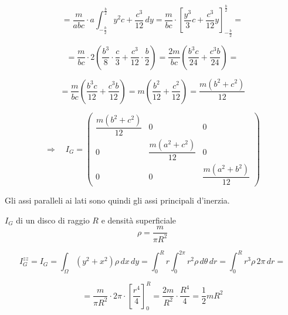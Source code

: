 \begin{example}{}
\[
=
\frac{m}{abc}\cdot a
\int_{-\frac{b}{2}}^{\frac{b}{2}}
y^2c+\frac{c^3}{12}
\,dy
=
\frac{m}{bc}\cdot
\left[
\frac{y^3}{3}c+\frac{c^3}{12}y
\right]_{-\frac{b}{2}}^{\frac{b}{2}}
=
\]

\[
=
\frac{m}{bc}\cdot 2
\left(
\frac{b^3}{8}\cdot\frac{c}{3}
+
\frac{c^3}{12}\cdot\frac{b}{2}
\right)
=
\frac{2m}{bc}
\left(
\frac{b^3c}{24}
+
\frac{c^3b}{24}
\right)
=
\]

\[
=
\frac{m}{bc}
\left(
\frac{b^3c}{12}
+
\frac{c^3b}{12}
\right)
=
m\left(
\frac{b^2}{12}
+
\frac{c^2}{12}
\right)
=
\frac{m(b^2+c^2)}{12}
\]

\[
\Rightarrow\quad
I_G=
\left(
\begin{array}{ccc}
\dfrac{m(b^2+c^2)}{12} & 0 & 0 \\[0.8em]
0 & \dfrac{m(a^2+c^2)}{12} & 0 \\[0.8em]
0 & 0 & \dfrac{m(a^2+b^2)}{12}
\end{array}
\right)
\]

Gli assi paralleli ai lati sono quindi gli assi principali d'inerzia.
\end{example}







\begin{example}{}
\(I_G\) di un disco di raggio \(R\) e densità superficiale
\[
\rho=\frac{m}{\pi R^2}
\]

\[
I_G^{zz}=I_G=\int_{\Omega}(y^2+x^2)\rho\, dx\,dy
=
\int_{0}^{R} r\int_{0}^{2\pi} r^2\rho\, d\theta\,dr
=
\int_{0}^{R} r^3\rho\,2\pi\,dr
=
\]

\[
=
\frac{m}{\pi R^2}\cdot 2\pi \cdot \left[\frac{r^4}{4}\right]_{0}^{R}
=
\frac{2m}{R^2}\cdot \frac{R^4}{4}
=
\frac{1}{2}mR^2
\]
\end{example}


